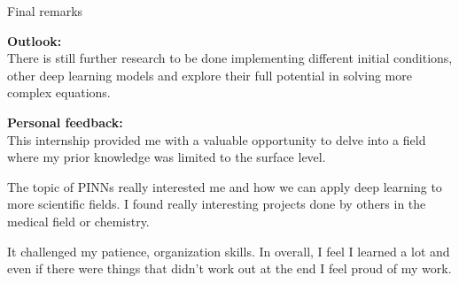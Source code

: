 \begin{frame}{Final remarks}

    \textbf{Outlook:}\\
    There is still further research to be done implementing different initial conditions, other deep learning models and explore their full 
    potential in solving more complex equations. 
    \vspace{0.3cm}

    \textbf{Personal feedback:}\\
    This internship provided me with a valuable opportunity to delve into a field where my prior knowledge was limited to the surface level.
    
    The topic of PINNs really interested me and how we can apply deep learning to more scientific fields. I found really interesting projects done by others 
    in the medical field or chemistry. 

    It challenged my patience, organization skills. In overall, I feel I learned a lot and even if there were things that didn't work out at the end
    I feel proud of my work. 
  

\end{frame}